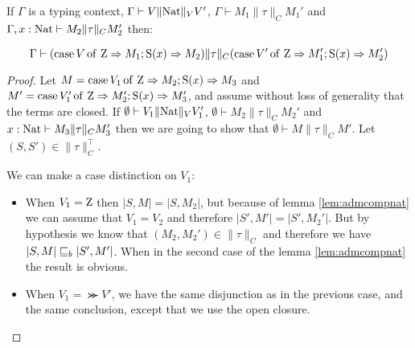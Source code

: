 \begin{alemma}
    If $\Gamma$ is a typing context, 
    $\Gamma \vdash V \| \textnormal{Nat} \|_V V'$,
    $\Gamma \vdash M_1 \| \tau \|_C M_1'$
    and $\Gamma, x:\textnormal{Nat} \vdash M_2 \| \tau \|_C M_2'$
    then:

    \begin{equation*}
        \Gamma \vdash (\operatorname{case} V \operatorname{of} \, \textnormal{Z} \Rightarrow M_1; \operatorname{S}(x) \Rightarrow M_2) \| \tau \|_C
            (\operatorname{case} V' \operatorname{of} \, \textnormal{Z} \Rightarrow M_1'; \operatorname{S}(x) \Rightarrow M_2')
    \end{equation*}
\end{alemma}
\begin{proof}
Let $M = \operatorname{case} V_1 \operatorname{of} \, \textnormal{Z} \Rightarrow M_2; \operatorname{S}(x) \Rightarrow M_3$ and $M' = \operatorname{case} V_1' \operatorname{of} \, \textnormal{Z} \Rightarrow M_2'; \operatorname{S}(x) \Rightarrow M_3'$,
and assume without loss of generality that the terms are closed. 
If $\emptyset \vdash V_1 \| \textnormal{Nat} \|_V V_1'$, 
$\emptyset \vdash M_2 \| \tau \|_C M_2'$
and $ x: \textnormal{Nat} \vdash M_3 \| \tau \|_C M_3'$ 
then we are going to show that $\emptyset \vdash M \| \tau \|_C M'$.
Let $(S,S') \in \| \tau \|_C^\top$.

We can make a case distinction on $V_1$:
\begin{itemize}
    \item When $V_1 = \textnormal{Z}$ then $|S,M| = |S,M_2|$,
        but because of lemma \ref{lem:admcompnat} 
        we can assume that $V_1 = V_2$ and therefore 
        $|S',M'| = |S', M_2'|$. But by hypothesis
        we know that $(M_2,M_2') \in \| \tau \|_C$ and therefore
        we have $| S, M| \sqsubseteq_b |S',M'|$. When in the second 
        case of the lemma \ref{lem:admcompnat} 
        the result is obvious.

    \item When $V_1 = \Succ V'$, we have the same 
        disjunction as in the previous case, and 
        the same conclusion, except that we use 
        the open closure.
\end{itemize}
\end{proof}



